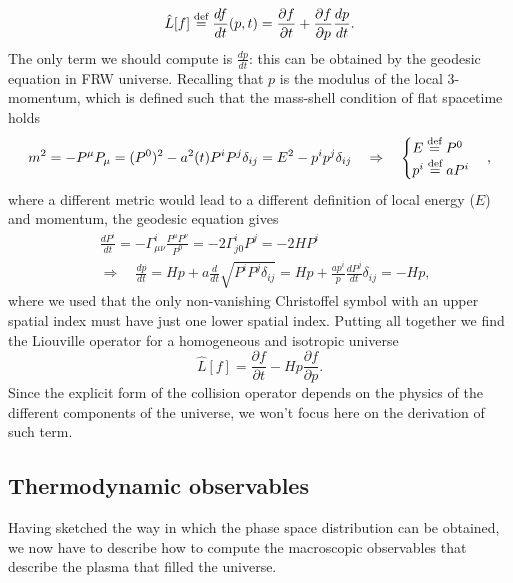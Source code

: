 $$
\hat{L}[f]\stackrel{\text{def}}{=}\frac{df}{dt}(p, t)= \frac{\partial f}{\partial t}+\frac{\partial f}{\partial p}\frac{dp}{dt}.
$$ 
The only term we should compute is $\tfrac{dp}{dt}$: this can be obtained by the geodesic equation in FRW universe. Recalling that $p$ is the modulus of the local 3-momentum, which is defined such that the mass-shell condition of flat spacetime holds
\begin{align*}
    m^2=-P^\mu P_\mu=(P^0)^2-a^2(t)P^iP^j\delta_{ij}=E^2-p^ip^j\delta_{ij}\quad\Rightarrow\quad
    \begin{cases}
        E\stackrel{\text{def}}{=} P^0\\
        p^i\stackrel{\text{def}}{=} a P^i
    \end{cases},
\end{align*}
where a different metric would lead to a different definition of local energy ($E$) and momentum, the geodesic equation gives
\begin{align*}
    &\frac{dP^i}{dt}=-\Gamma^{i}_{\mu\nu}\frac{P^\mu P^\nu}{P^0}=-2\Gamma^{i}_{j0}P^j=-2HP^i\\
    &\Rightarrow\quad \frac{dp}{dt}=H p+a\frac{d}{dt}\sqrt{P^iP^j\delta_{ij}}=Hp+\frac{ap^i}{p}\frac{dP^j}{dt}\delta_{ij}=-Hp,
\end{align*}
where we used that the only non-vanishing Christoffel symbol with an upper spatial index must have just one lower spatial index. Putting all together we find the Liouville operator for a homogeneous and isotropic universe
\begin{equation}
    \label{eq:Homo_Iso_Liouville}
    \hat L[f]=\frac{\partial f}{\partial t}-Hp\frac{\partial f}{\partial p}.
\end{equation}
Since the explicit form of the collision operator depends on the physics of the different components of the universe, we won't focus here on the derivation of such term. 
\subsection{Thermodynamic observables}
\label{sec:thdm_obs}
Having sketched the way in which the phase space distribution can be obtained, we now have to describe how to compute the macroscopic observables that describe the plasma that filled the universe. 

